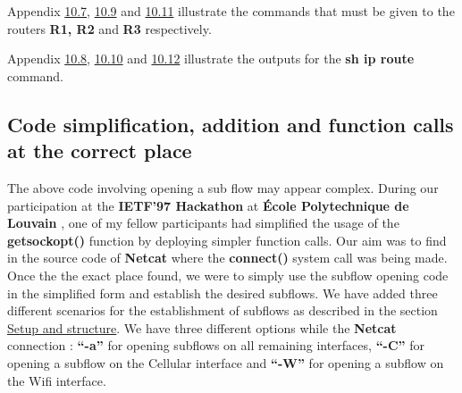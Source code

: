 \documentclass[a4paper,11pt]{article}
\begin{document}
			Appendix \hyperref[subsec:routerconf1]{10.7}, \hyperref[subsec:routerconf2]{10.9} and \hyperref[subsec:routerconf3]{10.11} illustrate the commands that must be given to the routers \textbf{R1, R2} and \textbf{R3} respectively.


			Appendix \hyperref[subsec:routerconfout1]{10.8}, \hyperref[subsec:routerconfout2]{10.10} and \hyperref[subsec:routerconfout3]{10.12} illustrate the outputs for the \textbf{sh ip route} command.

		\subsection{Code simplification, addition and function calls at the correct place}
			\label{subsec:codesimplify}
			The above code involving opening a sub flow may appear complex. During our participation at the \textbf{IETF'97 Hackathon} at \textbf{École Polytechnique de Louvain} \cite[hackathon]{ucl}, one of my fellow participants had simplified the usage of the \textbf{getsockopt()} function by deploying simpler function calls. Our aim was to find in the source code of \textbf{Netcat} where the \textbf{connect()} system call was being made. Once the the exact place found, we were to simply use the subflow opening code in the simplified form and establish the desired subflows. We have added three different scenarios for the establishment of subflows as described in the section \hyperref[subsec:setup]{Setup and structure}. We have three different options while the \textbf{Netcat} connection : \textbf{``-a''} for opening subflows on all remaining interfaces, \textbf{``-C''} for opening a subflow on the Cellular interface and \textbf{``-W''} for opening a subflow on the Wifi interface.
\end{document}
